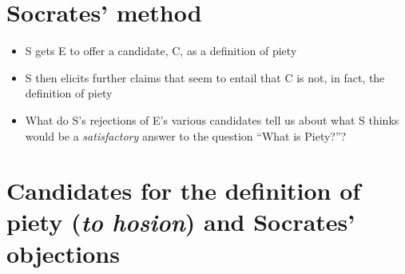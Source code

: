 \documentclass[11pt]{article}
\begin{document}
\section*{Socrates' method}

\begin{itemize}
\item{S gets E to offer a candidate, C, as a definition of piety}\item{S then elicits further claims that seem to entail that C is not, in fact, the definition of piety}\item{What do S's rejections of E's various candidates tell us about what S thinks would be a \emph{satisfactory} answer to the question ``What is Piety?''?}\end{itemize}
\vspace*{-8mm}
\section*{Candidates for the definition of piety (\emph{to hosion}) and Socrates' objections}
\end{document}
